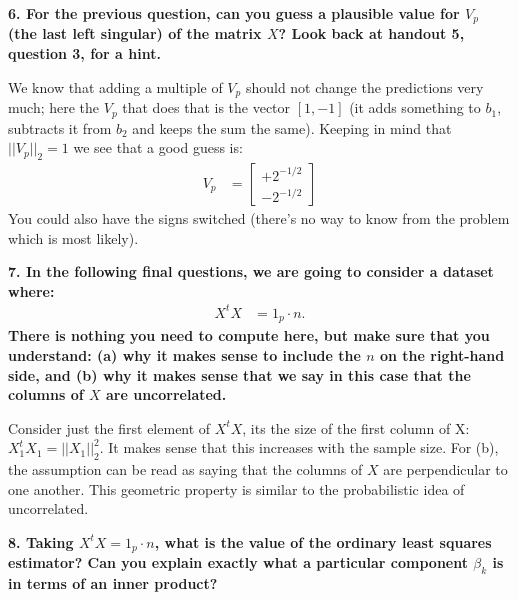 \documentclass[12pt,hidelinks]{article}
\numberwithin{equation}{section}
\begin{document}
\vspace*{12pt}

\textbf{6. For the previous question, can you guess a plausible value for $V_p$
(the last left singular) of the matrix $X$? Look back at handout 5, question 3,
for a hint.}

\vspace*{12pt}

We know that adding a multiple of $V_p$ should not change the predictions very
much; here the $V_p$ that does that is the vector $[1, -1]$ (it adds something
to $b_1$, subtracts it from $b_2$ and keeps the sum the same). Keeping in mind
that $|| V_p ||_2 = 1$ we see that a good guess is:
\begin{align}
V_p &= \begin{bmatrix} +2^{-1/2} \\ -2^{-1/2} \end{bmatrix}
\end{align}
You could also have the signs switched (there's no way to know from the problem
which is most likely).

\vspace*{12pt}

\textbf{7. In the following final questions, we are going to consider a dataset
where:}
\begin{align}
X^t X &= 1_p \cdot n.
\end{align}
\textbf{There is nothing you need to compute here, but make sure that you understand:
(a) why it makes sense to include the $n$ on the right-hand side, and (b) why
it makes sense that we say in this case that the columns of $X$ are uncorrelated.}

\vspace*{12pt}

Consider just the first element of $X^t X$, its the size of the first column of
X: $X_1^t X_1 = || X_1 ||_2^2$. It makes sense that this increases with the sample
size. For (b), the assumption can be read as saying that the columns of $X$ are
perpendicular to one another. This geometric property is similar to the probabilistic
idea of uncorrelated.

\vspace*{12pt}

\textbf{8. Taking $X^t X = 1_p \cdot n$, what is the value of the ordinary least
squares estimator? Can you explain exactly what a particular component $\beta_k$
is in terms of an inner product?}

\vspace*{12pt}
\end{document}
